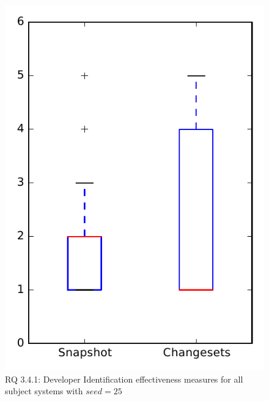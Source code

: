 
\begin{figure}
\centering
\includegraphics[height=0.4\textheight]{figures/dit_seed/rq1_overview_25}
\caption{RQ 3.4.1: Developer Identification effectiveness measures for all subject systems with $seed=25$}
\label{fig:dit_seed:rq1:overview}
\end{figure}
